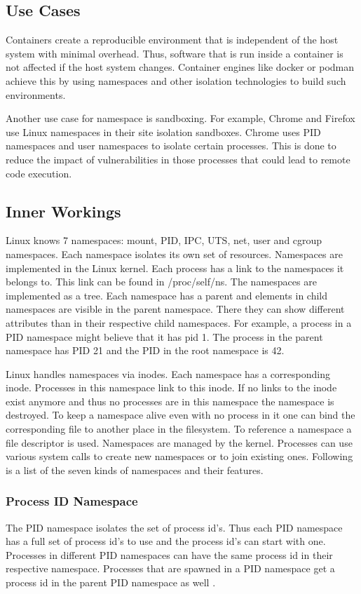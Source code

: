 \documentclass[10pt,twocolumn,a4paper]{article}
\begin{document}
\subsection{Use Cases}
Containers create a reproducible environment that is independent of the host system with minimal overhead.
Thus, software that is run inside a container is not affected if the host system changes. 
Container engines like docker or podman achieve this by using namespaces and other isolation
technologies to build such environments\cite{33}.


Another use case for namespace is sandboxing. For example, Chrome and Firefox use Linux namespaces
in their site isolation sandboxes. 
Chrome uses PID namespaces and user namespaces to isolate certain processes.
This is done to reduce the impact of vulnerabilities in those processes that could lead to remote
code execution\cite{32,34}.


\subsection{Inner Workings}
Linux knows 7 namespaces: mount, PID, IPC, UTS, net, user and cgroup namespaces. Each namespace isolates its own set of resources. Namespaces are implemented in the Linux kernel.
Each process has a link to the namespaces it belongs to. This link can be found in /proc/self/ns\cite{8}.
The namespaces are implemented as a tree.
Each namespace has a parent and elements in child namespaces are visible in the parent namespace.
There they can show different attributes than in their respective child namespaces. 
For example, a process in a PID namespace might believe that it has pid 1.
The process in the parent namespace has PID  21 and the PID in the root namespace is 42.

Linux handles namespaces via inodes. Each namespace has a corresponding inode.
Processes in this namespace link to this inode. 
If no links to the inode exist anymore and thus no processes are in
this namespace the namespace is destroyed. 
To keep a namespace alive even with no process in it one can bind 
the corresponding file to another place in the filesystem.
To reference a namespace a file descriptor is used.
Namespaces are managed by the kernel.
 Processes can use various system calls to create new namespaces or to join existing ones.\cite{8}
Following is a list of the seven kinds of namespaces and their features.


\subsubsection{Process ID Namespace}
The PID namespace isolates the set of process id's. 
Thus each PID namespace has a full set of process id's to use and  the process id's can start with one.
Processes in different PID namespaces can have the same process id in their respective namespace. 
Processes that are spawned in a PID namespace get a process id in the parent PID namespace as well 
\cite{11}.
\end{document}
